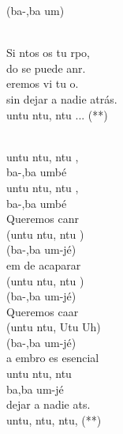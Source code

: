 \documentclass[12pt]{article}
\begin{document}
\begin{multicols*}{2}
\begin{cancion}
	(ba-,ba um)\\\jump\\
	\begin{chorus}%
	Si ntos os tu rpo,\\
	do se puede anr.\\
	eremos vi tu o. \\
sin dejar a nadie atrás.\\
	untu ntu, ntu ... (**)\\
	\end{chorus}%
	\jump\\
	untu ntu, ntu ,\\
	ba-,ba umbé\\
	untu ntu, ntu ,\\
	ba-,ba umbé\\
	Queremos canr\\
	(untu ntu, ntu )\\
	(ba-,ba um-jé)\\
\jump
	em de acaparar\\
	(untu ntu, ntu )\\
	(ba-,ba um-jé)\\
\jump
	Queremos caar\\
	(untu ntu, Utu Uh)\\
	(ba-,ba um-jé)\\
\jump
	a embro es esencial\\
	untu ntu, ntu \\
	ba,ba um-jé\\
\jump
	 dejar a nadie ats. \\
	untu, ntu, ntu,  (**)\\
\end{cancion}%


\end{multicols*}
\end{document}
